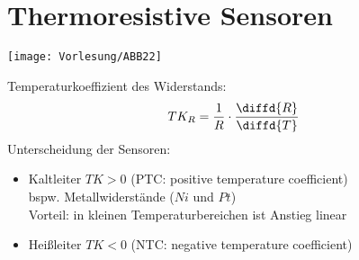 \documentclass{scrreprt}
\begin{document}
\section{Thermoresistive Sensoren}
\begin{center}
\texttt{[image: Vorlesung/ABB22]}
\end{center}
Temperaturkoeffizient des Widerstands:
$$TK_R=\frac{1}{R}\cdot \frac{\diffd{R}}{\diffd{T}}$$
Unterscheidung der Sensoren:
\begin{itemize}
\item Kaltleiter $TK>0$ (PTC: positive temperature coefficient)\\
bspw. Metallwiderstände ($Ni$ und $Pt$)\\
Vorteil: in kleinen Temperaturbereichen ist Anstieg linear
\item Heißleiter $TK<0$ (NTC: negative temperature coefficient)
\end{itemize}
\end{document}

